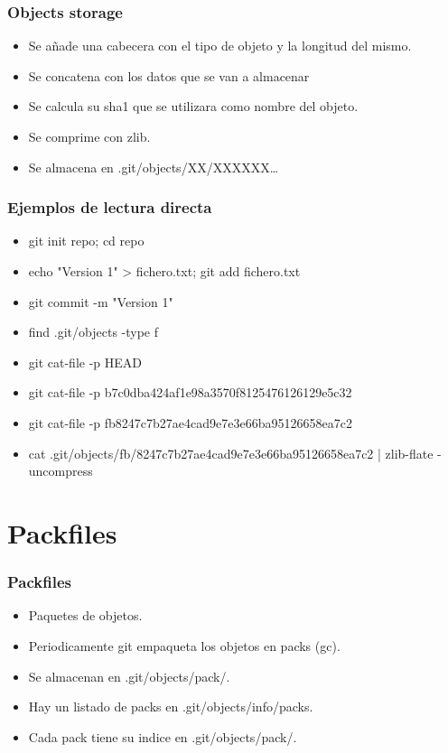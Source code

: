 \documentclass[10pt]{beamer}
\begin{document}
  \begin{frame}
    \frametitle{Objects storage}
    \begin{itemize}
        \item Se añade una cabecera con el tipo de objeto y la longitud del mismo.
        \item Se concatena con los datos que se van a almacenar
        \item Se calcula su sha1 que se utilizara como nombre del objeto.
        \item Se comprime con zlib.
        \item Se almacena en .git/objects/XX/XXXXXX\dots{}
    \end{itemize}
  \end{frame}

  \begin{frame}
    \frametitle{Ejemplos de lectura directa}
    \begin{itemize}
        \item git init repo; cd repo
        \item echo "Version 1" > fichero.txt; git add fichero.txt
        \item git commit -m "Version 1"
        \item find .git/objects -type f
        \item git cat-file -p HEAD
        \item git cat-file -p b7c0dba424af1e98a3570f8125476126129e5c32
        \item git cat-file -p fb8247c7b27ae4cad9e7e3e66ba95126658ea7c2
        \item cat .git/objects/fb/8247c7b27ae4cad9e7e3e66ba95126658ea7c2 | zlib-flate -uncompress
    \end{itemize}
  \end{frame}

  \section*{Packfiles}

  \begin{frame}
    \frametitle{Packfiles}
    \begin{itemize}
        \item Paquetes de objetos.
        \item Periodicamente git empaqueta los objetos en packs (gc).
        \item Se almacenan en .git/objects/pack/.
        \item Hay un listado de packs en .git/objects/info/packs.
        \item Cada pack tiene su indice en .git/objects/pack/.
    \end{itemize}
  \end{frame}
\end{document}
